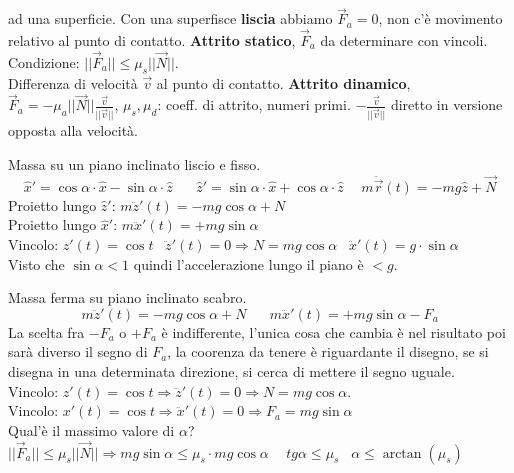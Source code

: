 ad una superficie. Con una superfisce \textbf{liscia} abbiamo $\vec{F}_a = 0$, non c'è
movimento relativo al punto di contatto. \textbf{Attrito statico}, $\vec{F}_a$ da determinare con vincoli. Condizione: $||\vec{F}_a|| \leq \mu_s ||\vec{N}||$.\\
Differenza di velocità $\vec{v}$ al punto di contatto. \textbf{Attrito dinamico}, $\vec{F}_a = -\mu_a ||\vec{N}||\frac{\vec{v}}{||\vec{v}||}$, $\mu_s, \mu_d$: coeff. di attrito, numeri primi.
$-\frac{\vec{v}}{||\vec{v}||}$ diretto in versione opposta alla velocità.

\begin{example}
    Massa su un piano inclinato liscio e fisso.
    $$\hat{x}' = \cos\alpha \cdot \hat{x} - \sin\alpha \cdot \hat{z} \hspace{20pt}\hat{z}' = \sin\alpha \cdot \hat{x} + \cos\alpha \cdot \hat{z} \hspace{15pt} m\ddot{\vec{r}}(t) = -mg\hat{z} + \vec{N}$$
    Proietto lungo $\hat{z}'$: \hspace{15pt} $m\ddot{z}'(t) = -mg\cos\alpha + N$\\
    Proietto lungo $\hat{x}'$: \hspace{15pt} $m\ddot{x}'(t) = +mg\sin\alpha$\\
    Vincolo: $z'(t) = \cos t \hspace{10pt} \ddot{z}'(t) = 0 \Rightarrow N = mg\cos\alpha \hspace{10pt} \ddot{x}'(t) = g \cdot \sin\alpha$\\
    Visto che $\sin\alpha < 1$ quindi l'accelerazione lungo il piano è $< g$.
\end{example}

\begin{example}
    Massa ferma su piano inclinato scabro.
    $$m\ddot{z}'(t) = -mg\cos\alpha + N \hspace{20pt} m\ddot{x}'(t) = +mg\sin\alpha - F_{a}$$
    La scelta fra $-F_{a}$ o $+F_a$ è indifferente, l'unica cosa che cambia è nel risultato poi sarà diverso il segno di $F_a$, la coorenza da tenere è riguardante il disegno, se si disegna
    in una determinata direzione, si cerca di mettere il segno uguale.\\
    Vincolo: $z'(t) = \cos t \Rightarrow \ddot{z}'(t) = 0 \Rightarrow N = mg\cos\alpha$.\\
    Vincolo: $x'(t) = \cos t \Rightarrow \ddot{x}'(t) = 0 \Rightarrow F_a = mg\sin\alpha$\\
    Qual'è il massimo valore di $\alpha$?\\
    $||\vec{F}_a|| \leq \mu_s ||\vec{N}|| \Rightarrow mg\sin\alpha \leq \mu_s \cdot mg \cos\alpha \hspace{15pt} tg\alpha \leq \mu_s \hspace{10pt} \alpha \leq \arctan(\mu_s)$
\end{example}

